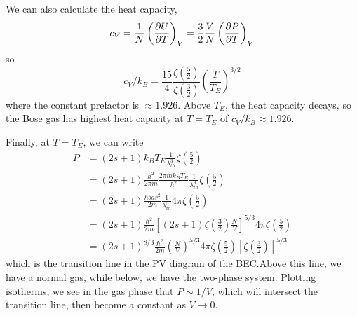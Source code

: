 We can also calculate the heat capacity,
\[c_V = \frac{1}{N}\left(\frac{\partial U}{\partial T}\right)_V = \frac{3}{2}\frac{V}{N}\left(\frac{\partial P}{\partial T}\right)_V\]
so
\begin{equation}
c_V/k_B = \frac{15}{4}\frac{\zeta(\frac{5}{2})}{\zeta(\frac{3}{2})}\left(\frac{T}{T_E}\right)^{3/2}
\end{equation}
where the constant prefactor is \(\approx 1.926\). Above \(T_E\), the heat capacity decays, so the Bose gas has highest heat capacity at \(T=T_E\) of \(c_V/k_B\approx 1.926\).

Finally, at \(T=T_E\), we can write
\begin{align*}
	P &=(2s+1)k_BT_E\frac{1}{\lambda^3_{th}}\zeta\left(\tfrac{5}{2}\right)\\
	  &=(2s+1)\frac{h^2}{2\pi m}\frac{2\pi m k_BT_E}{h^2}\frac{1}{\lambda^3_{th}}\zeta\left(\tfrac{5}{2}\right)\\
	  &=(2s+1)\frac{hbar^2}{2m}\frac{1}{\lambda_{th}^5}4\pi\zeta\left(\tfrac{5}{2}\right)\\
	  &=(2s+1)\frac{\hbar^2}{2m}\left[(2s+1)\zeta\left(\tfrac{3}{2}\right)\frac{N}{V}\right]^{5/3}4\pi\zeta\left(\tfrac{5}{2}\right)\\
	  &=(2s+1)^{8/3}\frac{\hbar^2}{2m}\left(\frac{N}{V}\right)^{5/3}4\pi\zeta\left(\tfrac{5}{2}\right)\left[\zeta\left(\tfrac{3}{2}\right)\right]^{5/3}
\end{align*}
which is the transition line in the PV diagram of the BEC.\@ Above this line, we have a normal gas, while below, we have the two-phase system. Plotting isotherms, we see in the gas phase that \(P\sim 1/V\), which will intersect the transition line, then become a constant as \(V\to 0\).



